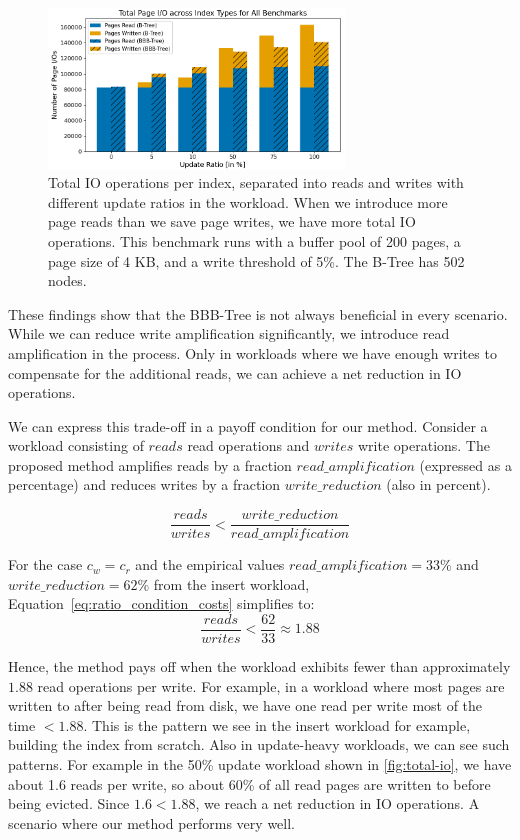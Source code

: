 \begin{figure}[htbp]
  \centering
  \includegraphics[width=0.7\textwidth]{figures/evaluation/pageviews_total_io_across_update_ratios.png}
    \caption{Total \ac{IO} operations per index, separated into reads and writes with different update ratios in the workload. When we introduce more page reads than we save page writes, we have more total \ac{IO} operations. This benchmark runs with a buffer pool of 200 pages, a page size of 4 KB, and a write threshold of 5\%. The B-Tree has 502 nodes.}
  \label{fig:total-io}
\end{figure}

These findings show that the BBB-Tree is not always beneficial in every scenario.
While we can reduce write amplification significantly, we introduce read amplification in the process.
Only in workloads where we have enough writes to compensate for the additional reads, we can achieve a net reduction in \ac{IO} operations.

We can express this trade-off in a payoff condition for our method.
Consider a workload consisting of $reads$ read operations and $writes$ write operations.
The proposed method amplifies reads by a fraction $read\_amplification$ (expressed as a percentage)  
and reduces writes by a fraction $write\_reduction$ (also in percent).

\begin{equation}
\frac{reads}{writes} < \frac{write\_reduction}{read\_amplification}
\label{eq:ratio_condition}
\end{equation}

For the case $c_w = c_r$ and the empirical values
$read\_amplification = 33\%$ and $write\_reduction = 62\%$ from the insert workload,  
Equation~\ref{eq:ratio_condition_costs} simplifies to:
\begin{equation}
\frac{reads}{writes} < \frac{62}{33} \approx 1.88
\end{equation}

Hence, the method pays off when the workload exhibits fewer than approximately $1.88$ read operations per write.
For example, in a workload where most pages are written to after being read from disk, we have one read per write most of the time $< 1.88$.
This is the pattern we see in the insert workload for example, building the index from scratch.
Also in update-heavy workloads, we can see such patterns.
For example in the 50\% update workload shown in \autoref{fig:total-io}, we have about 1.6 reads per write, so about 60\% of all read pages are written to before being evicted.
Since $1.6 < 1.88$, we reach a net reduction in \ac{IO} operations.
A scenario where our method performs very well. 

